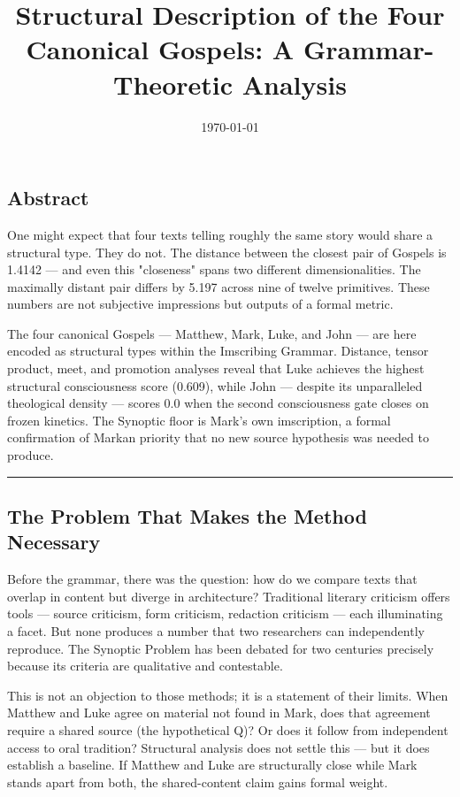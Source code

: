 \documentclass[12pt,a4paper]{article}
\begin{document}
\title{Structural Description of the Four Canonical Gospels: A Grammar-Theoretic Analysis}
\date{\today}

\maketitle

\subsection{Abstract}

One might expect that four texts telling roughly the same story would share a structural type. They do not. The distance between the closest pair of Gospels is 1.4142 --- and even this "closeness" spans two different dimensionalities. The maximally distant pair differs by 5.197 across nine of twelve primitives. These numbers are not subjective impressions but outputs of a formal metric.

The four canonical Gospels --- Matthew, Mark, Luke, and John --- are here encoded as structural types within the Imscribing Grammar. Distance, tensor product, meet, and promotion analyses reveal that Luke achieves the highest structural consciousness score (0.609), while John --- despite its unparalleled theological density --- scores 0.0 when the second consciousness gate closes on frozen kinetics. The Synoptic floor is Mark's own imscription, a formal confirmation of Markan priority that no new source hypothesis was needed to produce.

\begin{center}
\rule{0.5\textwidth}{0.4pt}
\end{center}

\subsection{The Problem That Makes the Method Necessary}

Before the grammar, there was the question: how do we compare texts that overlap in content but diverge in architecture? Traditional literary criticism offers tools --- source criticism, form criticism, redaction criticism --- each illuminating a facet. But none produces a number that two researchers can independently reproduce. The Synoptic Problem has been debated for two centuries precisely because its criteria are qualitative and contestable.

This is not an objection to those methods; it is a statement of their limits. When Matthew and Luke agree on material not found in Mark, does that agreement require a shared source (the hypothetical Q)? Or does it follow from independent access to oral tradition? Structural analysis does not settle this --- but it does establish a baseline. If Matthew and Luke are structurally close while Mark stands apart from both, the shared-content claim gains formal weight.
\end{document}
